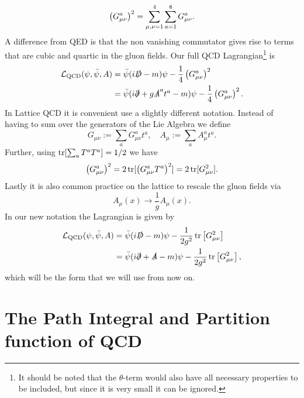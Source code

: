 \begin{equation}
    \left(G_{\mu\nu}^a\right)^2=\sum_{\mu,\nu=1}^4\sum_{a=1}^8G_{\mu\nu}^a.
\end{equation}
A difference from QED is that the non vanishing commutator gives rise to terms that are cubic and quartic in the gluon fields.
Our full QCD Lagrangian\footnote{It should be noted that the $\theta$-term would also have all necessary properties to be included, but since it is very small it can be ignored.} is
\begin{align}
    \mathcal L_{\text {QCD}}(\psi, \bar\psi, A)&=\bar\psi(i\slashed D-m)\psi-\frac{1}{4}\left(G_{\mu\nu}^a\right)^2\\
    &=\bar\psi(i\slashed \partial +g\slashed A^at^a-m)\psi-\frac{1}{4}\left(G_{\mu\nu}^a\right)^2.
\end{align}
In Lattice QCD it is convenient use a slightly different notation. Instead of having to sum over the generators of the Lie Algebra we define
\begin{equation}
    G_{\mu\nu}:=\sum_a G_{\mu\nu}^at^a,\quad A_\mu:=\sum_a A_\mu^at^a.
\end{equation}
Further, using $\operatorname{tr} [\sum_aT^aT^a]=1/2$ we have 
\begin{equation}
    \left(G_{\mu\nu}^a\right)^2=2\operatorname{tr} [\left(G_{\mu\nu}^aT^a\right)^2]=2\operatorname{tr}[G_{\mu\nu}^2].
\end{equation}
Lastly it is also common practice on the lattice to rescale the gluon fields via
\begin{equation}
    A_\mu(x)\rightarrow\frac{1}{g}A_\mu(x).
\end{equation}
In our new notation the Lagrangian is given by
\begin{align}
    \mathcal L_{\text {QCD}}(\psi, \bar\psi, A)&=\bar\psi(i\slashed D-m)\psi-\frac{1}{2g^2}\operatorname{tr}\left[G_{\mu\nu}^2\right]\\
    &=\bar\psi(i\slashed \partial +\slashed A-m)\psi-\frac{1}{2g^2}\operatorname{tr}\left[G_{\mu\nu}^2\right],\label{eq:qcdLagr}
\end{align}
which will be the form that we will use from now on\cite{peskin}.






\section{The Path Integral and Partition function of QCD}\label{sec:pathIntPartFunc}

